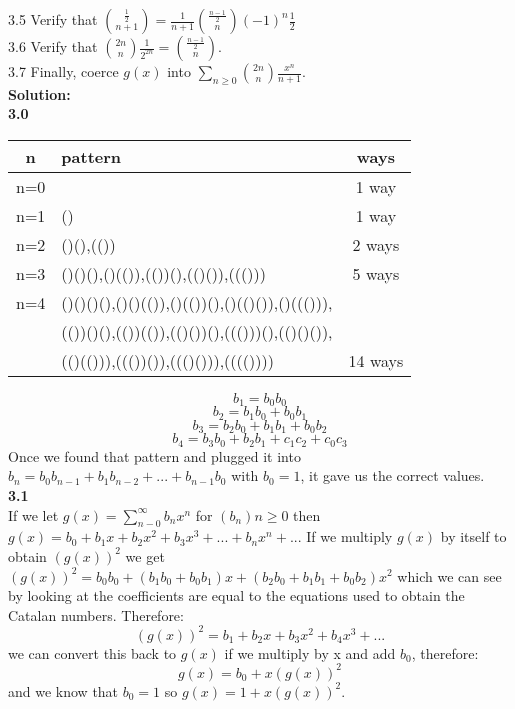 \documentclass[10pt,a4paper]{report}
\begin{document}
	3.5 Verify that $\binom{\frac{1}{2}}{n+1} = \frac{1}{n+1}\binom{\frac{n-1}{2}}{n}(-1)^n\frac{1}{2}$\\
	3.6 Verify that $\binom{2n}{n}\frac{1}{2^{2n}} = \binom{\frac{n-1}{2}}{n}$.\\
	3.7 Finally, coerce $g(x)$ into $\sum_{n\geq0}^{}\binom{2n}{n}\frac{x^n}{n+1}$.\\
	\newline
	\textbf{Solution: }\\
	\newline
	\textbf{3.0}\\
	\begin{center}
		\begin{tabular}{|c||l|c|}
			\hline
			n&pattern&ways\\
			\hline
			\hline
			n=0&&1 way\\
			\hline
			n=1&()&1 way\\
			\hline
			n=2&()(),(())&2 ways\\
			\hline
			n=3&()()(),()(()),(())(),(()()),((()))&5 ways\\
			\hline
			n=4&()()()(),()()(()),()(())(),()(()()),()((())),&\\&(())()(),(())(()),(()())(),((()))(),(()()()),&\\&(()(())),((())()),((()())),(((())))&14 ways\\
			\hline		
		\end{tabular}
	\end{center}
	\[b_1 = b_0b_0\]\[b_2 = b_1b_0 + b_0b_1\]\[b_3 = b_2b_0 + b_1b_1 + b_0b_2\]\[b_4 = b_3b_0 + b_2b_1 + c_1c_2 + c_0c_3  \]
	Once we found that pattern and plugged it into $b_n = b_0b_{n-1} + b_1b_{n-2} + ... + b_{n-1}b_0$ with $b_0 = 1$, it gave us the correct values.\\
	\newline
	\textbf{3.1}\\
	If we let $g(x) = \sum_{n-0}^{\infty}b_nx^n$ for $(b_n)n\geq0$ then $g(x) = b_0 + b_1x + b_2x^2 + b_3x^3 + ... + b_nx^n + ...$ If we multiply $g(x)$ by itself to obtain $(g(x))^2$ we get $(g(x))^2 = b_0b_0 + (b_1b_0 + b_0b_1)x + (b_2b_0 + b_1b_1 + b_0b_2)x^2$ which we can see by looking at the coefficients are equal to the equations used to obtain the Catalan numbers.  Therefore:
	\[(g(x))^2 = b_1 + b_2x + b_3x^2 + b_4x^3 + ...\]
	we can convert this back to $g(x)$ if we multiply by x and add $b_0$, therefore:
	\[g(x) = b_0 + x(g(x))^2\]
	and we know that $b_0 = 1$ so $g(x) = 1 + x(g(x))^2$.\\
\end{document}
